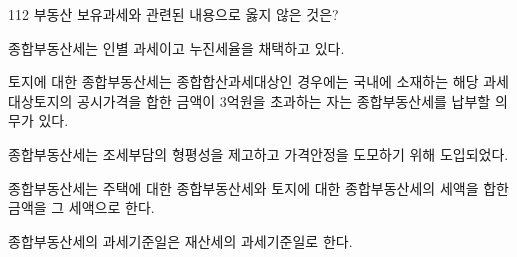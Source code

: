 \begin{question}{112}
부동산 보유과세와 관련된 내용으로 옳지 않은 것은?
\begin{choices}
  \item 종합부동산세는 인별 과세이고 누진세율을 채택하고 있다.
  \item 토지에 대한 종합부동산세는 종합합산과세대상인 경우에는 국내에 소재하는 해당 과세대상토지의 공시가격을 합한 금액이 3억원을 초과하는 자는 종합부동산세를 납부할 의무가 있다.
  \item 종합부동산세는 조세부담의 형평성을 제고하고 가격안정을 도모하기 위해 도입되었다.
  \item 종합부동산세는 주택에 대한 종합부동산세와 토지에 대한 종합부동산세의 세액을 합한 금액을 그 세액으로 한다.
  \item 종합부동산세의 과세기준일은 재산세의 과세기준일로 한다.
\end{choices}
\end{question}
